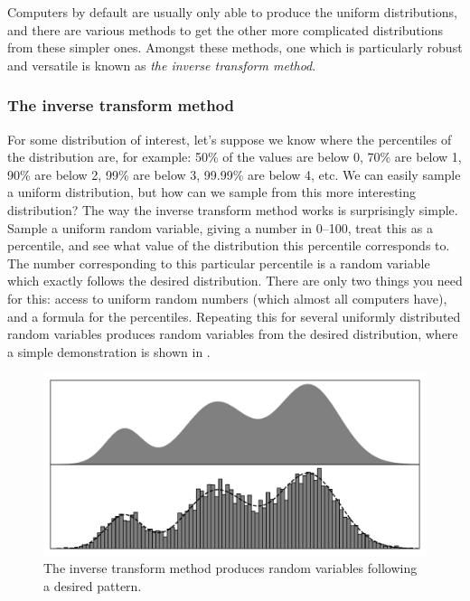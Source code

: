 \documentclass[11pt,a4paper,twoside,english]{extarticle}
\begin{document}
Computers by default are usually only able to produce the uniform distributions, and there are various methods to get the other more complicated distributions from these simpler ones. Amongst these methods, one which is particularly robust and versatile is known as \emph{the inverse transform method}.

\subsubsection{The inverse transform method}

For some distribution of interest, let's suppose we know where the percentiles of the distribution are, for example: 50\% of the values are below 0, 70\% are below 1, 90\% are below 2, 99\% are below 3, 99.99\% are below  4, etc. We can easily sample a uniform distribution, but how can we sample from this more interesting distribution? The way the inverse transform method works is surprisingly simple. Sample a uniform random variable, giving a number in 0--100, treat this as a percentile, and see what value of the distribution this percentile corresponds to. The number corresponding to this particular percentile is a random variable which exactly follows the desired distribution. There are only two things you need for this: access to uniform random numbers (which almost all computers have), and a formula for the percentiles. Repeating this for several uniformly distributed random variables produces random variables from the desired distribution, where a simple demonstration is shown in .

\begin{figure}[htb]
\centering
\includegraphics[width=0.7\linewidth, clip=true, trim={5mm, 2mm, 5mm, 5mm}]{inverse_cdf_transformation_method_schematic_simplified}
\caption[The inverse transform method]{The inverse transform method produces random variables following a desired pattern.}
\label{fig:inverse_cdf_transformation_method_schematic_simplified}
\end{figure}
\end{document}
